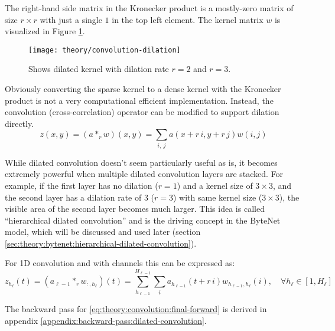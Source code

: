 The right-hand side matrix in the Kronecker product is a mostly-zero matrix of size $r \times r$ with just a single $1$ in the top left element. The kernel matrix $w$ is visualized in Figure \ref{fig:convolution:dilation}.

\begin{figure}[h]
	\centering
	\texttt{[image: theory/convolution-dilation]}
	\caption{Shows dilated kernel with dilation rate $r = 2$ and $r = 3$.}
	\label{fig:convolution:dilation}
\end{figure}

Obviously converting the sparse kernel to a dense kernel with the Kronecker product is not a very computational efficient implementation. Instead, the convolution (cross-correlation) operator can be modified to support dilation directly.
\begin{equation}
z(x, y) = (a *_r w)(x, y) = \sum_{i,\ j} a(x + r\, i, y + r\, j) w(i, j)
\end{equation}

While dilated convolution doesn't seem particularly useful as is, it becomes extremely powerful when multiple dilated convolution layers are stacked. For example, if the first layer has no dilation ($r = 1$) and a kernel size of $3 \times 3$, and the second layer has a dilation rate of 3 ($r = 3$) with same kernel size ($3 \times 3$), the visible area of the second layer becomes much larger. This idea is called ``hierarchical dilated convolution'' and is the driving concept in the ByteNet model, which will be discussed and used later (section \ref{sec:theory:bytenet:hierarchical-dilated-convolution}).

For 1D convolution and with channels this can be expressed as:
\begin{equation}
z_{h_\ell}(t) = (a_{\ell-1} *_r w_{:, h_\ell})(t) = \sum_{h_{\ell-1}}^{H_{\ell-1}} \sum_{i} a_{h_{\ell-1}}(t + r\,i) w_{h_{\ell-1}, h_\ell}(i), \quad \forall h_\ell \in [1, H_\ell]
\label{eq:theory:convolution:final-forward}
\end{equation}

The backward pass for \eqref{eq:theory:convolution:final-forward} is derived in appendix \ref{appendix:backward-pass:dilated-convolution}.
